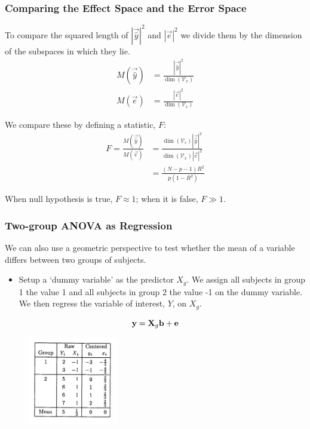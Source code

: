 \documentclass{beamer}
\begin{document}
\begin{frame}
  \frametitle{Comparing the Effect Space and the Error Space}

To compare the squared length of $|\vec{\hat{y}}|^2$ and $|\vec{e}|^2$ we divide them by the dimension of the subspaces in which they lie.
\begin{align*}
M(\vec{\hat{y}}) &= \frac{|\vec{\hat{y}}|^2} {\dim(\mathcal{V}_x)}   \\
M(\vec{e})       &= \frac{|\vec{e}|^2}{\dim(\mathcal{V}_e)}
\end{align*}

We compare these by defining a statistic, $F$:
\begin{align*}
  F = \frac{M(\vec{\hat{y}})}{M(\vec{e})} &= \frac{\dim(\mathcal{V}_e)|\vec{\hat{y}}|^2}
                                                  {\dim(\mathcal{V}_x)|\vec{e}|^2}\\
 &= \frac{(N-p-1)R^2}{p(1-R^2)}
\end{align*}

\alert{When null hypothesis is true, $F\approx 1$; when it is false, $F \gg 1$.}

\end{frame}



\begin{frame}
  \frametitle{Two-group ANOVA as Regression}

We can also use a geometric perspective to test whether the mean of a variable differs between two groups of subjects.

\begin{itemize}
\item Setup a `dummy variable' as the predictor $X_g$.   We assign all subjects in group 1 the value 1 and all subjects in group 2 the value -1 on the dummy variable.  We then regress the variable of interest, $Y$, on $X_g$.  

\end{itemize}
%
$$
\mathbf{y} = \mathbf{X}_g\mathbf{b} + \mathbf{e}
$$
%
\begin{figure}
{\centering \includegraphics[height=1.5in]{anova-2group-table.pdf}}
\end{figure}


\end{frame}
\end{document}
